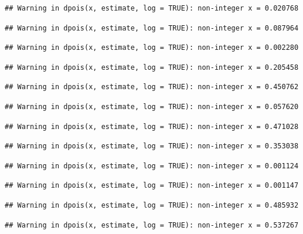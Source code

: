 \documentclass[]{article}
\begin{document}
\begin{verbatim}
## Warning in dpois(x, estimate, log = TRUE): non-integer x = 0.020768
\end{verbatim}

\begin{verbatim}
## Warning in dpois(x, estimate, log = TRUE): non-integer x = 0.087964
\end{verbatim}

\begin{verbatim}
## Warning in dpois(x, estimate, log = TRUE): non-integer x = 0.002280
\end{verbatim}

\begin{verbatim}
## Warning in dpois(x, estimate, log = TRUE): non-integer x = 0.205458
\end{verbatim}

\begin{verbatim}
## Warning in dpois(x, estimate, log = TRUE): non-integer x = 0.450762
\end{verbatim}

\begin{verbatim}
## Warning in dpois(x, estimate, log = TRUE): non-integer x = 0.057620
\end{verbatim}

\begin{verbatim}
## Warning in dpois(x, estimate, log = TRUE): non-integer x = 0.471028
\end{verbatim}

\begin{verbatim}
## Warning in dpois(x, estimate, log = TRUE): non-integer x = 0.353038
\end{verbatim}

\begin{verbatim}
## Warning in dpois(x, estimate, log = TRUE): non-integer x = 0.001124
\end{verbatim}

\begin{verbatim}
## Warning in dpois(x, estimate, log = TRUE): non-integer x = 0.001147
\end{verbatim}

\begin{verbatim}
## Warning in dpois(x, estimate, log = TRUE): non-integer x = 0.485932
\end{verbatim}

\begin{verbatim}
## Warning in dpois(x, estimate, log = TRUE): non-integer x = 0.537267
\end{verbatim}
\end{document}
